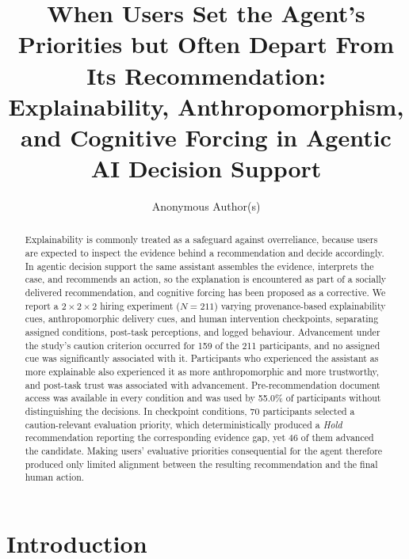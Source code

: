 \title{When Users Set the Agent's Priorities but Often Depart From Its
Recommendation: Explainability, Anthropomorphism, and Cognitive Forcing in
Agentic AI Decision Support}

\author{Anonymous Author(s)}

\begin{abstract}
Explainability is commonly treated as a safeguard against overreliance,
because users are expected to inspect the evidence behind a recommendation
and decide accordingly. In agentic decision support the same assistant
assembles the evidence, interprets the case, and recommends an action, so
the explanation is encountered as part of a socially delivered
recommendation, and cognitive forcing has been proposed as a corrective. We
report a $2 \times 2 \times 2$ hiring experiment ($N=211$) varying
provenance-based explainability cues, anthropomorphic delivery cues, and
human intervention checkpoints, separating assigned conditions, post-task
perceptions, and logged behaviour. Advancement under the study's caution
criterion occurred for 159 of the 211 participants, and no assigned cue was
significantly associated with it. Participants who experienced the
assistant as more explainable also experienced it as more anthropomorphic
and more trustworthy, and post-task trust was associated with advancement.
Pre-recommendation document access was available in every condition and was
used by 55.0\% of participants without distinguishing the decisions. In
checkpoint conditions, 70 participants selected a caution-relevant
evaluation priority, which deterministically produced a \emph{Hold}
recommendation reporting the corresponding evidence gap, yet 46 of them
advanced the candidate. Making users' evaluative priorities consequential
for the agent therefore produced only limited alignment between the
resulting recommendation and the final human action.
\end{abstract}


\maketitle

\section{Introduction}

